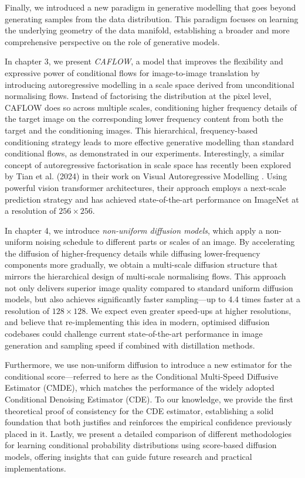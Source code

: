 Finally, we introduced a new paradigm in generative modelling that goes beyond generating samples from the data distribution. This paradigm focuses on learning the underlying geometry of the data manifold, establishing a broader and more comprehensive perspective on the role of generative models.

In chapter 3, we present \emph{CAFLOW}, a model that improves the flexibility and expressive power of conditional flows for image-to-image translation by introducing autoregressive modelling in a scale space derived from unconditional normalising flows. Instead of factorising the distribution at the pixel level, CAFLOW does so across multiple scales, conditioning higher frequency details of the target image on the corresponding lower frequency content from both the target and the conditioning images. This hierarchical, frequency-based conditioning strategy leads to more effective generative modelling than standard conditional flows, as demonstrated in our experiments. Interestingly, a similar concept of autoregressive factorisation in scale space has recently been explored by Tian et al. (2024) in their work on Visual Autoregressive Modelling \cite{tian2024visual}. Using powerful vision transformer architectures, their approach employs a next-scale prediction strategy and has achieved state-of-the-art performance on ImageNet at a resolution of $256\times256$.

In chapter 4, we introduce \emph{non-uniform diffusion models}, which apply a non-uniform noising schedule to different parts or scales of an image. By accelerating the diffusion of higher-frequency details while diffusing lower-frequency components more gradually, we obtain a multi-scale diffusion structure that mirrors the hierarchical design of multi-scale normalising flows. This approach not only delivers superior image quality compared to standard uniform diffusion models, but also achieves significantly faster sampling—up to 4.4 times faster at a resolution of $128\times128$. We expect even greater speed-ups at higher resolutions, and believe that re-implementing this idea in modern, optimised diffusion codebases could challenge current state-of-the-art performance in image generation and sampling speed if combined with distillation methods.

Furthermore, we use non-uniform diffusion to introduce a new estimator for the conditional score—referred to here as the Conditional Multi-Speed Diffusive Estimator (CMDE), which matches the performance of the widely adopted Conditional Denoising Estimator (CDE). To our knowledge, we provide the first theoretical proof of consistency for the CDE estimator, establishing a solid foundation that both justifies and reinforces the empirical confidence previously placed in it. Lastly, we present a detailed comparison of different methodologies for learning conditional probability distributions using score-based diffusion models, offering insights that can guide future research and practical implementations.

